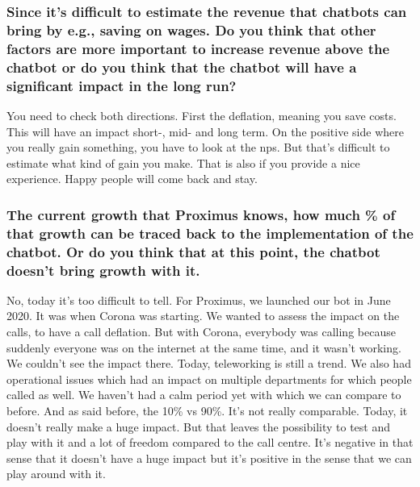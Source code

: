 \begin{appendices}
	\subsubsection{Since it’s difficult to estimate the revenue that chatbots can bring by e.g., saving on wages. Do you think that other factors are more important to increase revenue above the chatbot or do you think that the chatbot will have a significant impact in the long run?}
	You need to check both directions. First the deflation, meaning you save costs. This will have an impact short-, mid- and long term. On the positive side where you really gain something, you have to look at the \gls{nps}. But that’s difficult to estimate what kind of gain you make. That is also if you provide a nice experience. Happy people will come back and stay.
	
	\subsubsection{The current growth that Proximus knows, how much \% of that growth can be traced back to the implementation of the chatbot. Or do you think that at this point, the chatbot doesn’t bring growth with it.}
	No, today it’s too difficult to tell. For Proximus, we launched our bot in June 2020. It was when Corona was starting. We wanted to assess the impact on the calls, to have a call deflation. But with Corona, everybody was calling because suddenly everyone was on the internet at the same time, and it wasn’t working. We couldn’t see the impact there. Today, teleworking is still a trend. We also had operational issues which had an impact on multiple departments for which people called as well. We haven’t had a calm period yet with which we can compare to before. And as said before, the 10\% vs 90\%. It’s not really comparable. Today, it doesn’t really make a huge impact. But that leaves the possibility to test and play with it and a lot of freedom compared to the call centre. It’s negative in that sense that it doesn’t have a huge impact but it’s positive in the sense that we can play around with it.
	

\end{appendices}
